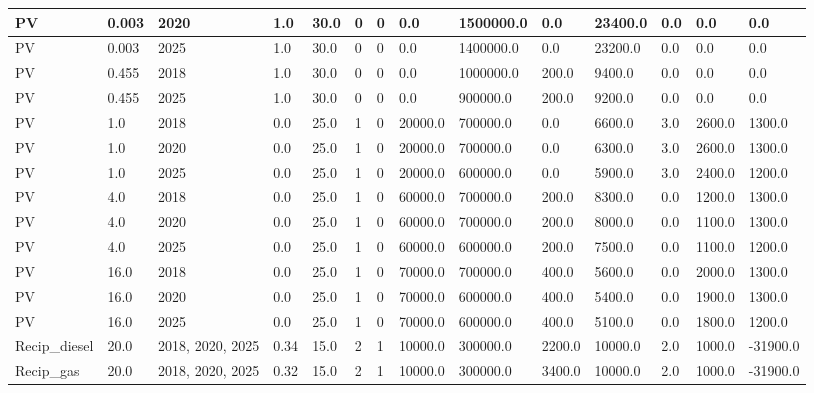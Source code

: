 \documentclass[sigconf]{acmart}
\begin{document}
\begin{table*}[]
\begin{tabular}{|l|l|l|l|l|l|l|l|l|l|l|l|l|l|}
		PV            & 0.003       & 2020             & 1.0    & 30.0 & 0     & 0     & 0.0      & 1500000.0 & 0.0      & 23400.0 & 0.0   & 0.0     & 0.0      \\ \hline
		PV            & 0.003       & 2025             & 1.0    & 30.0 & 0     & 0     & 0.0      & 1400000.0 & 0.0      & 23200.0 & 0.0   & 0.0     & 0.0      \\ \hline
		PV            & 0.455       & 2018             & 1.0    & 30.0 & 0     & 0     & 0.0      & 1000000.0 & 200.0    & 9400.0  & 0.0   & 0.0     & 0.0      \\ \hline
		PV            & 0.455       & 2025             & 1.0    & 30.0 & 0     & 0     & 0.0      & 900000.0  & 200.0    & 9200.0  & 0.0   & 0.0     & 0.0      \\ \hline
		PV            & 1.0         & 2018             & 0.0    & 25.0 & 1     & 0     & 20000.0  & 700000.0  & 0.0      & 6600.0  & 3.0   & 2600.0  & 1300.0   \\ \hline
		PV            & 1.0         & 2020             & 0.0    & 25.0 & 1     & 0     & 20000.0  & 700000.0  & 0.0      & 6300.0  & 3.0   & 2600.0  & 1300.0   \\ \hline
		PV            & 1.0         & 2025             & 0.0    & 25.0 & 1     & 0     & 20000.0  & 600000.0  & 0.0      & 5900.0  & 3.0   & 2400.0  & 1200.0   \\ \hline
		PV            & 4.0         & 2018             & 0.0    & 25.0 & 1     & 0     & 60000.0  & 700000.0  & 200.0    & 8300.0  & 0.0   & 1200.0  & 1300.0   \\ \hline
		PV            & 4.0         & 2020             & 0.0    & 25.0 & 1     & 0     & 60000.0  & 700000.0  & 200.0    & 8000.0  & 0.0   & 1100.0  & 1300.0   \\ \hline
		PV            & 4.0         & 2025             & 0.0    & 25.0 & 1     & 0     & 60000.0  & 600000.0  & 200.0    & 7500.0  & 0.0   & 1100.0  & 1200.0   \\ \hline
		PV            & 16.0        & 2018             & 0.0    & 25.0 & 1     & 0     & 70000.0  & 700000.0  & 400.0    & 5600.0  & 0.0   & 2000.0  & 1300.0   \\ \hline
		PV            & 16.0        & 2020             & 0.0    & 25.0 & 1     & 0     & 70000.0  & 600000.0  & 400.0    & 5400.0  & 0.0   & 1900.0  & 1300.0   \\ \hline
		PV            & 16.0        & 2025             & 0.0    & 25.0 & 1     & 0     & 70000.0  & 600000.0  & 400.0    & 5100.0  & 0.0   & 1800.0  & 1200.0   \\ \hline
		Recip\_diesel & 20.0        & 2018, 2020, 2025 & 0.34   & 15.0 & 2     & 1     & 10000.0  & 300000.0  & 2200.0   & 10000.0 & 2.0   & 1000.0  & -31900.0 \\ \hline
		Recip\_gas    & 20.0        & 2018, 2020, 2025 & 0.32   & 15.0 & 2     & 1     & 10000.0  & 300000.0  & 3400.0   & 10000.0 & 2.0   & 1000.0  & -31900.0 \\ \hline
	\end{tabular}
\end{table*}
\end{document}
